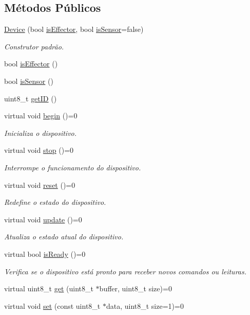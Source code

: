 \subsection*{Métodos Públicos}
\begin{DoxyCompactItemize}
\item 
\hyperlink{classDevice_a6a343295a9f8df6dd4aa52c622a8e876}{Device} (bool \hyperlink{classDevice_a463598bce318556c79bfc0f26b38f7d3}{is\-Effector}, bool \hyperlink{classDevice_a848bce229a669a4e7531bce2b6b24154}{is\-Sensor}=false)
\begin{DoxyCompactList}\small\item\em Construtor padrão. \end{DoxyCompactList}\item 
bool \hyperlink{classDevice_a463598bce318556c79bfc0f26b38f7d3}{is\-Effector} ()
\item 
bool \hyperlink{classDevice_a848bce229a669a4e7531bce2b6b24154}{is\-Sensor} ()
\item 
uint8\-\_\-t \hyperlink{classDevice_a7b20d7fdcab77062810a0a254e978c5e}{get\-I\-D} ()
\item 
virtual void \hyperlink{classDevice_a0dc99b16a220489d787a1cbcef4875d9}{begin} ()=0
\begin{DoxyCompactList}\small\item\em Inicializa o dispositivo. \end{DoxyCompactList}\item 
virtual void \hyperlink{classDevice_a22430f274658b04c280b5cc2d53aa1e4}{stop} ()=0
\begin{DoxyCompactList}\small\item\em Interrompe o funcionamento do dispositivo. \end{DoxyCompactList}\item 
virtual void \hyperlink{classDevice_a6e43162e890cb40eafb923b0c94d167a}{reset} ()=0
\begin{DoxyCompactList}\small\item\em Redefine o estado do dispositivo. \end{DoxyCompactList}\item 
virtual void \hyperlink{classDevice_a7e5226b6341b1cf2ec04a5913b97becc}{update} ()=0
\begin{DoxyCompactList}\small\item\em Atualiza o estado atual do dispositivo. \end{DoxyCompactList}\item 
virtual bool \hyperlink{classDevice_a30065df084d450dbaae9d68215e01e6f}{is\-Ready} ()=0
\begin{DoxyCompactList}\small\item\em Verifica se o dispositivo está pronto para receber novos comandos ou leituras. \end{DoxyCompactList}\item 
virtual uint8\-\_\-t \hyperlink{classDevice_a0057af09515609c289d5da3be19dcc8d}{get} (uint8\-\_\-t $\ast$buffer, uint8\-\_\-t size)=0
\item 
virtual void \hyperlink{classDevice_a3b4bf3ff761f93c024675548755586d8}{set} (const uint8\-\_\-t $\ast$data, uint8\-\_\-t size=1)=0
\end{DoxyCompactItemize}


